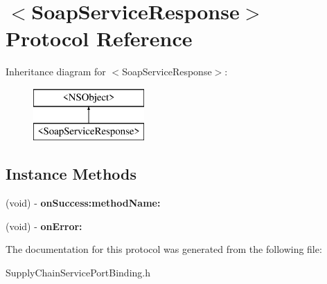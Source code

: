 \hypertarget{protocol_soap_service_response-p}{}\section{$<$Soap\+Service\+Response$>$ Protocol Reference}
\label{protocol_soap_service_response-p}
Inheritance diagram for $<$Soap\+Service\+Response$>$\+:\begin{figure}[H]
\begin{center}
\leavevmode
\includegraphics[height=2.000000cm]{protocol_soap_service_response-p}
\end{center}
\end{figure}
\subsection*{Instance Methods}
\begin{DoxyCompactItemize}
\item 
\hypertarget{protocol_soap_service_response-p_af7eb2ffebffd964c47df6a9ba2234a10}{}(void) -\/ {\bfseries on\+Success\+:method\+Name\+:}\label{protocol_soap_service_response-p_af7eb2ffebffd964c47df6a9ba2234a10}

\item 
\hypertarget{protocol_soap_service_response-p_acdc9678596ea02a9cc909d46ccbe295d}{}(void) -\/ {\bfseries on\+Error\+:}\label{protocol_soap_service_response-p_acdc9678596ea02a9cc909d46ccbe295d}

\end{DoxyCompactItemize}


The documentation for this protocol was generated from the following file\+:\begin{DoxyCompactItemize}
\item 
Supply\+Chain\+Service\+Port\+Binding.\+h\end{DoxyCompactItemize}
